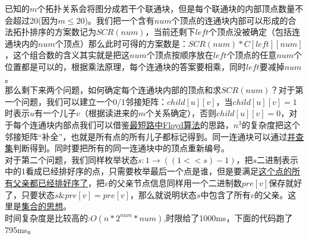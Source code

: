 已知的$m$个拓扑关系会将图分成若干个联通块，但是每个联通块的内部顶点数量不会超过20(因为$m\leq 20$)。我们把一个含有$num$个顶点的连通块内部可以形成的合法拓扑排序的方案数记为$SCR(num)$，当前还剩下$left$个顶点没被确定（包括连通块内的$num$个顶点）那么此时可得的方案数是：$SCR(num)*C[left][num]$，这个组合数的含义其实就是把这$num$个顶点按顺序放在$left$个顶点的任意$num$个位置都是可以的，根据乘法原理，每个连通块的答案要相乘，同时$left$要减掉$num$。 \\
那么剩下来两个问题，如何确定每个连通块内部的顶点和求$SCR(num)$？对于第一个问题，我们可以建立一个0/1邻接矩阵：$child[u][v]$，当$child[u][v]=1$时表示$u$有一个儿子$v$（根据读进来的$m$个关系确定），否则$child[u][v]=0$，对于每个连通块内部点我们可以借鉴\underline {最短路中Floyd算法}的思路，$n^3$的复杂度把这个邻接矩阵“补全”，也就是所有点的所有儿子都标记得到。同一连通块可以通过\underline {并查集}判断得到。同时要把所有的同一连通块中的顶点重新编号。 \\
对于第二个问题，我们同样枚举状态$s: 1\rightarrow ((1 << s) -1)$，把$s$二进制表示中的1看成已经排好序的点，只需要枚举最后一个点是谁，但是要满足\underline {这个点的所有父亲都已经排好序了}，把$v$的父亲节点信息同样用一个二进制数$pre[v]$保存就好了，只要状态$s\& pre[v]=pre[v]$，那么就说明状态$s$中包含了所有$v$的父亲。这里是\underline {集合的思想}。 \\
时间复杂度是比较高的:$O(n*2^{num}*num)$,时限给了1000ms，下面的代码跑了795ms。


